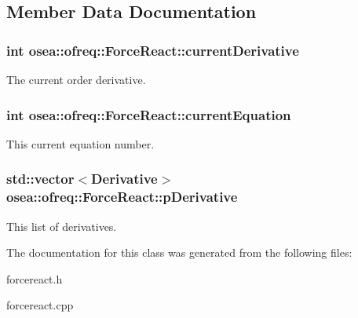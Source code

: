 \subsection{Member Data Documentation}
\hypertarget{classosea_1_1ofreq_1_1_force_react_a56c47ef95ad9ac1876b832dbf75297dd}{
\subsubsection[{current\-Derivative}]{\setlength{\rightskip}{0pt plus 5cm}int osea\-::ofreq\-::\-Force\-React\-::current\-Derivative\hspace{0.3cm}{\ttfamily [protected]}}}\label{classosea_1_1ofreq_1_1_force_react_a56c47ef95ad9ac1876b832dbf75297dd}
The current order derivative. \hypertarget{classosea_1_1ofreq_1_1_force_react_a35b2a5464dd0135961e04a8389f5967f}{
\subsubsection[{current\-Equation}]{\setlength{\rightskip}{0pt plus 5cm}int osea\-::ofreq\-::\-Force\-React\-::current\-Equation\hspace{0.3cm}{\ttfamily [protected]}}}\label{classosea_1_1ofreq_1_1_force_react_a35b2a5464dd0135961e04a8389f5967f}
This current equation number. \hypertarget{classosea_1_1ofreq_1_1_force_react_a28d2bfdc97809181be4d21713cc52181}{
\subsubsection[{p\-Derivative}]{\setlength{\rightskip}{0pt plus 5cm}std\-::vector$<${\bf Derivative}$>$ osea\-::ofreq\-::\-Force\-React\-::p\-Derivative\hspace{0.3cm}{\ttfamily [protected]}}}\label{classosea_1_1ofreq_1_1_force_react_a28d2bfdc97809181be4d21713cc52181}
This list of derivatives. 

The documentation for this class was generated from the following files\-:\begin{DoxyCompactItemize}
\item 
forcereact.\-h\item 
forcereact.\-cpp\end{DoxyCompactItemize}
